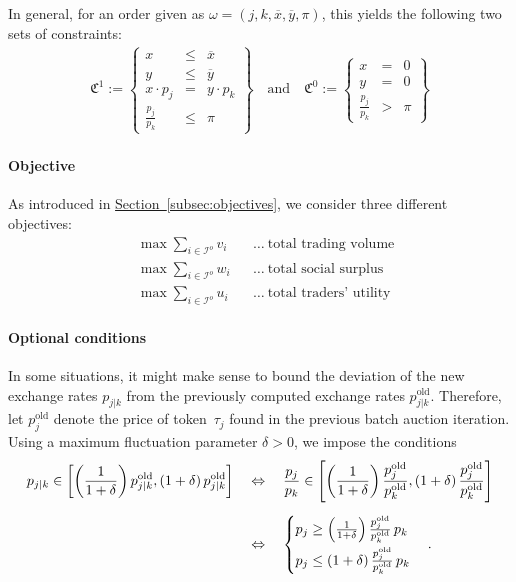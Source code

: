 \documentclass[11pt,parskip=full]{scrartcl}%
\newcommand*{\iorders}{\mathcal{I}^o}       %
\newcommand*{\secref}[1]{\hyperref[{#1}]{Section~\ref*{#1}}}
\begin{document}
In general, for an order given as $ \omega = (j,k,\overline{x},\overline{y},\pi) $, this yields
the following two sets of constraints:
\begin{align}
  \mathfrak{C}^1 := \left\{
  \begin{array}{rll}
    x &\le & \overline{x} \\
    y &\le & \overline{y} \\
    x \cdot p_j &= & y \cdot p_k \\[1mm]
    \frac{p_j}{p_k} &\le & \pi
  \end{array}
  \right\}
  \quad
  \text{and}
  \quad
  \mathfrak{C}^0 := \left\{
  \begin{array}{rll}
    x &= & 0 \\
    y &= & 0 \\[1mm]
    \frac{p_j}{p_k} &> & \pi
  \end{array}
  \right\}
  \label{eq:order_model_generic}
\end{align}

\paragraph{Objective}

As introduced in \secref{subsec:objectives}, we consider three different objectives:
\begin{align*}
  && &\max\sum_{i \in \iorders} v_i && \ldots\>\text{total trading volume}&&\\
  && &\max\sum_{i \in \iorders} w_i && \ldots\>\text{total social surplus}&&\\
  && &\max\sum_{i \in \iorders} u_i && \ldots\>\text{total traders' utility}&&
\end{align*}


\paragraph{Optional conditions}

In some situations, it might make sense to bound the deviation of the new exchange rates $p_{j|k}$ from the previously computed exchange rates $ p_{j|k}^\mathrm{old} $.
Therefore, let $ p^\mathrm{old}_j $ denote the price of token~$ \tau_j $ found in the previous
batch auction iteration.
Using a maximum fluctuation parameter $ \delta > 0 $, we impose the conditions
\begin{align}
  p_{j|k} \in
  \left[
    \left(\frac{1}{1+\delta}\right) p^\mathrm{old}_{j|k},
    (1+\delta) \, p^\mathrm{old}_{j|k}
  \right]
  \quad &\Leftrightarrow \quad
  \frac{p_j}{p_k} \in
  \left[
    \left(\frac{1}{1+\delta}\right) \frac{p^\mathrm{old}_j}{p^\mathrm{old}_k},
    (1+\delta) \, \frac{p^\mathrm{old}_j}{p^\mathrm{old}_k}
  \right]\notag\\[2mm]
  \quad &\Leftrightarrow \quad
  \begin{cases}
    p_j \ge \left(\frac{1}{1+\delta}\right) \frac{p^\mathrm{old}_j}{p^\mathrm{old}_k} \, p_k
    \\[2mm]
    p_j \le \left(1+\delta\right) \frac{p^\mathrm{old}_j}{p^\mathrm{old}_k} \, p_k
  \end{cases}.
  \label{eq:bounds_xrates}
\end{align}
\end{document}
